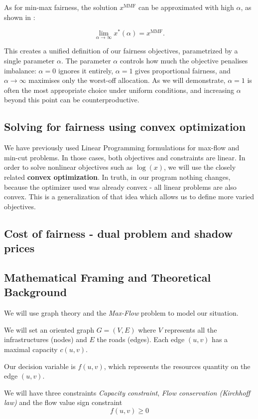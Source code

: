 \documentclass[12pt, openany]{article}
\begin{document}
As for min-max fairness, the solution \(x^{\mathrm{MMF}}\) can be approximated with high $\alpha$, as shown in \cite{mo2000fair}:

\[
\lim_{\alpha \to \infty}
x^*(\alpha)
=
x^{\mathrm{MMF}}.
\]

This creates a unified definition of our fairness objectives, parametrized by a single parameter $\alpha$. The parameter $\alpha$ controls how much the objective penalises imbalance: $\alpha = 0$ ignores it entirely, $\alpha = 1$ gives proportional fairness, and $\alpha \to \infty$ maximises only the worst-off allocation. As we will demonstrate, $\alpha = 1$ is often the most appropriate choice under uniform conditions, and increasing $\alpha$ beyond this point can be counterproductive.

\subsection{Solving for fairness using convex optimization}

We have previously used Linear Programming formulations for max-flow and min-cut problems. In those cases, both objectives and constraints are linear. In order to solve nonlinear objectives such as $\log(x)$, we will use the closely related \textbf{convex optimization}. In truth, in our program nothing changes, because the optimizer used was already convex - all linear problems are also convex. This is a generalization of that idea which allows us to define more varied objectives.
 
\subsection{Cost of fairness - dual problem and shadow prices}


\subsection{Mathematical Framing and Theoretical Background}

We will use graph theory and the \textit{Max-Flow} problem to model our situation.

We will set an oriented graph $G=(V,E)$ where $V$ represents all the infrastructures (nodes) and $E$ the roads (edges). Each edge $(u,v)$ has a maximal capacity $c(u,v)$.

Our decision variable is $f(u,v)$, which represents the resources quantity on the edge $(u,v)$.

We will have three constraints \emph{Capacity constraint}, \emph{Flow conservation (Kirchhoff law)} and the flow value sign constraint
    \[
        f(u, v) \geq 0
    \]
\end{document}
